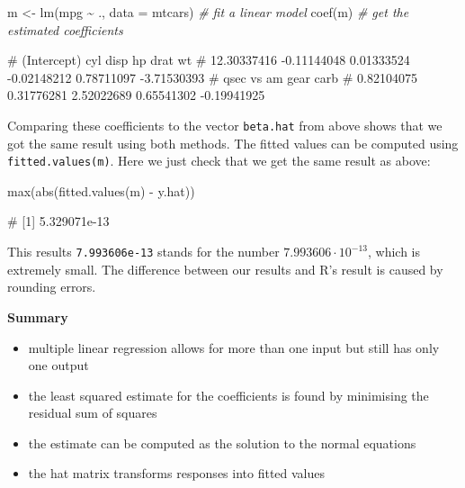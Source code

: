 \documentclass[
  a4paper,
]{article}
\newenvironment{Shaded}{\begin{snugshade}}{\end{snugshade}}
\newcommand{\AttributeTok}[1]{\textcolor[rgb]{0.77,0.63,0.00}{#1}}
\newcommand{\CommentTok}[1]{\textcolor[rgb]{0.56,0.35,0.01}{\textit{#1}}}
\newcommand{\FunctionTok}[1]{\textcolor[rgb]{0.00,0.00,0.00}{#1}}
\newcommand{\NormalTok}[1]{#1}
\newcommand{\OtherTok}[1]{\textcolor[rgb]{0.56,0.35,0.01}{#1}}
\newcommand{\SpecialCharTok}[1]{\textcolor[rgb]{0.00,0.00,0.00}{#1}}
\providecommand{\tightlist}{%
  \setlength{\itemsep}{0pt}\setlength{\parskip}{0pt}}
\theoremstyle{definition}
\theoremstyle{definition}
\theoremstyle{definition}
\theoremstyle{definition}
\theoremstyle{remark}
\begin{document}
\begin{Shaded}
\begin{Highlighting}[]
\NormalTok{m }\OtherTok{\textless{}{-}} \FunctionTok{lm}\NormalTok{(mpg }\SpecialCharTok{\textasciitilde{}}\NormalTok{ ., }\AttributeTok{data =}\NormalTok{ mtcars) }\CommentTok{\# fit a linear model}
\FunctionTok{coef}\NormalTok{(m) }\CommentTok{\# get the estimated coefficients}
\end{Highlighting}
\end{Shaded}

\begin{Shaded}
\begin{Highlighting}[]
\NormalTok{\# (Intercept)         cyl        disp          hp        drat          wt }
\NormalTok{\# 12.30337416 {-}0.11144048  0.01333524 {-}0.02148212  0.78711097 {-}3.71530393 }
\NormalTok{\#        qsec          vs          am        gear        carb }
\NormalTok{\#  0.82104075  0.31776281  2.52022689  0.65541302 {-}0.19941925}
\end{Highlighting}
\end{Shaded}

Comparing these coefficients to the vector \texttt{beta.hat} from above shows
that we got the same result using both methods. The fitted values
can be computed using \texttt{fitted.values(m)}. Here we just check that we get
the same result as above:

\begin{Shaded}
\begin{Highlighting}[]
\FunctionTok{max}\NormalTok{(}\FunctionTok{abs}\NormalTok{(}\FunctionTok{fitted.values}\NormalTok{(m) }\SpecialCharTok{{-}}\NormalTok{ y.hat))}
\end{Highlighting}
\end{Shaded}

\begin{Shaded}
\begin{Highlighting}[]
\NormalTok{\# [1] 5.329071e{-}13}
\end{Highlighting}
\end{Shaded}

This results \texttt{7.993606e-13} stands for the number \(7.993606 \cdot 10^{-13}\),
which is extremely small. The difference between our results and R's result
is caused by rounding errors.

\textbf{Summary}

\begin{itemize}
\tightlist
\item
  multiple linear regression allows for more than one input
  but still has only one output
\item
  the least squared estimate for the coefficients is found
  by minimising the residual sum of squares
\item
  the estimate can be computed as the solution to the normal equations
\item
  the hat matrix transforms responses into fitted values
\end{itemize}
\end{document}
